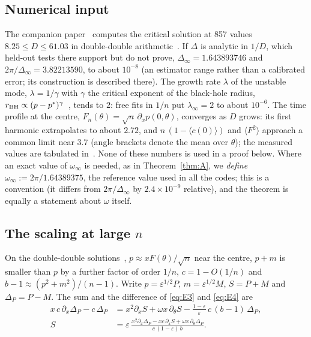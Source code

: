 \documentclass{amsart}
\numberwithin{equation}{section}
\theoremstyle{plain}
\theoremstyle{definition}
\theoremstyle{remark}
\newcommand{\Dinf}{\Delta_\infty}
\newcommand{\winf}{\omega_\infty}
\newcommand{\eps}{\varepsilon}
\begin{document}
\subsection{Numerical input}
\label{sec:numbers}
The companion paper~\cite{companion} computes the critical solution at 857 values $8.25 \le D \le 61.03$ in
double-double arithmetic~\cite{Dekker1971}. If $\Delta$ is analytic in $1/D$, which held-out tests there support but do not prove,
$\Dinf = 1.643893746$ and $2\pi/\Dinf = 3.82213590$, to about $10^{-8}$ (an estimator range rather than a calibrated
error; its construction is described there). The growth rate $\lambda$ of the unstable mode, $\lambda = 1/\gamma$
with $\gamma$ the critical exponent of the black-hole radius, $r_{\rm BH} \propto (p - p^*)^{\gamma}$~\cite{KoikeHaraAdachi1995},
tends to $2$: free fits in $1/n$ put $\lambda_\infty = 2$ to about $10^{-6}$. The time profile at the centre,
$F_n(\theta) = \sqrt n\,\partial_x p(0, \theta)$, converges as $D$ grows: its first harmonic extrapolates to about $2.72$,
and $n\,(1 - \langle c(0)\rangle)$ and $\langle F^2\rangle$ approach a common limit near $3.7$ (angle brackets denote the
mean over $\theta$); the measured values are tabulated in~\cite{companion}. None of these numbers is used in a
proof below. Where an exact value of $\winf$ is needed, as in Theorem~\ref{thm:A}, we \emph{define}
$\winf := 2\pi/1.64389375$, the reference value used in all the codes; this is a convention (it differs from
$2\pi/\Dinf$ by $2.4\times10^{-9}$ relative), and the theorem is equally a statement about $\omega$ itself.

\subsection{The scaling at large \texorpdfstring{$n$}{n}}
\label{sec:ansatz}
On the double-double solutions~\cite{companion}, $p \approx x F(\theta)/\sqrt n$ near the centre, $p + m$ is smaller
than $p$ by a further factor of order $1/n$, $c = 1 - O(1/n)$ and $b - 1 \approx (p^2+m^2)/(n-1)$. Write $p = \eps^{1/2}P$, $m = \eps^{1/2}M$, $S = P + M$ and $\Delta_P = P - M$. The sum and the difference of
\eqref{eq:E3} and \eqref{eq:E4} are
\begin{align}
x\,c\,\partial_x \Delta_P - c\,\Delta_P &= x^2 \partial_x S + \omega x\,\partial_\theta S - \tfrac{1-\eps}{\eps}\, c\,(b-1)\,\Delta_P ,
\label{eq:sum}\\
S &= \eps\,\frac{x^2 \partial_x \Delta_P - x c\,\partial_x S + \omega x\,\partial_\theta \Delta_P}{c\,(1-\eps)\,b} .
\label{eq:diff}
\end{align}
\end{document}
